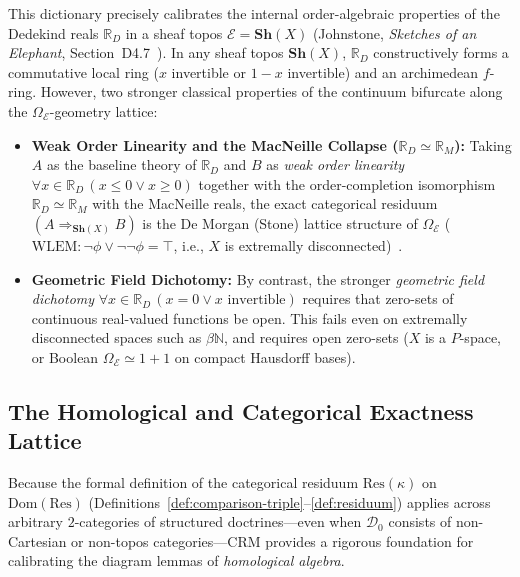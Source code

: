 \documentclass[10pt,twoside,openright]{book}
\theoremstyle{crmplain}
\theoremstyle{crmdef}
\theoremstyle{crmremark}
\begin{document}
This dictionary precisely calibrates the internal order-algebraic properties of the Dedekind reals $\mathbb{R}_D$ in a sheaf topos $\mathcal{E} = \mathbf{Sh}(X)$ (Johnstone, \emph{Sketches of an Elephant}, Section~D4.7~\cite{Johnstone02}). In any sheaf topos $\mathbf{Sh}(X)$, $\mathbb{R}_D$ constructively forms a commutative local ring ($x$ invertible or $1-x$ invertible) and an archimedean $f$-ring. However, two stronger classical properties of the continuum bifurcate along the $\Omega_{\mathcal{E}}$-geometry lattice:

\begin{itemize}[leftmargin=1.5em]

  \item \textbf{Weak Order Linearity and the MacNeille Collapse ($\mathbb{R}_D \simeq \mathbb{R}_M$):} Taking $A$ as the baseline theory of $\mathbb{R}_D$ and $B$ as \emph{weak order linearity} $\forall x \in \mathbb{R}_D\,(x \le 0 \vee x \ge 0)$ together with the order-completion isomorphism $\mathbb{R}_D \simeq \mathbb{R}_M$ with the MacNeille reals, the exact categorical residuum $(A \Rightarrow_{\mathbf{Sh}(X)} B)$ is the De Morgan (Stone) lattice structure of $\Omega_{\mathcal{E}}$ ($\mathrm{WLEM}: \neg\phi \vee \neg\neg\phi = \top$, i.e., $X$ is extremally disconnected)~\cite{Johnstone02}.

  \item \textbf{Geometric Field Dichotomy:} By contrast, the stronger \emph{geometric field dichotomy} $\forall x \in \mathbb{R}_D\,(x = 0 \vee x \text{ invertible})$ requires that zero-sets of continuous real-valued functions be open. This fails even on extremally disconnected spaces such as $\beta\mathbb{N}$, and requires open zero-sets ($X$ is a $P$-space, or Boolean $\Omega_{\mathcal{E}} \simeq 1+1$ on compact Hausdorff bases).

\end{itemize}

\subsection{The Homological and Categorical Exactness Lattice}

Because the formal definition of the categorical residuum $\mathrm{Res}(\kappa)$ on $\mathrm{Dom}(\mathrm{Res})$ (Definitions~\ref{def:comparison-triple}--\ref{def:residuum}) applies across arbitrary $2$-categories of structured doctrines---even when $\mathcal{D}_0$ consists of non-Cartesian or non-topos categories---$\mathrm{CRM}$ provides a rigorous foundation for calibrating the diagram lemmas of \emph{homological algebra}.
\end{document}
